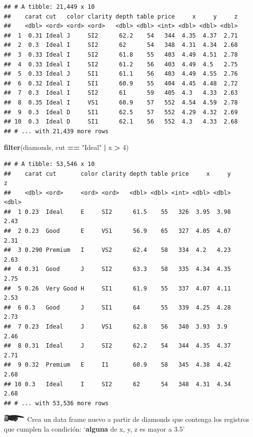 \documentclass[]{book}
\newenvironment{Shaded}{\begin{snugshade}}{\end{snugshade}}
\newcommand{\KeywordTok}[1]{\textcolor[rgb]{0.13,0.29,0.53}{\textbf{#1}}}
\newcommand{\DecValTok}[1]{\textcolor[rgb]{0.00,0.00,0.81}{#1}}
\newcommand{\StringTok}[1]{\textcolor[rgb]{0.31,0.60,0.02}{#1}}
\newcommand{\OperatorTok}[1]{\textcolor[rgb]{0.81,0.36,0.00}{\textbf{#1}}}
\newcommand{\NormalTok}[1]{#1}
\theoremstyle{definition}
\theoremstyle{definition}
\theoremstyle{definition}
\theoremstyle{remark}
\begin{document}
\begin{verbatim}
## # A tibble: 21,449 x 10
##    carat cut   color clarity depth table price     x     y     z
##    <dbl> <ord> <ord> <ord>   <dbl> <dbl> <int> <dbl> <dbl> <dbl>
##  1  0.31 Ideal J     SI2      62.2    54   344  4.35  4.37  2.71
##  2  0.3  Ideal I     SI2      62      54   348  4.31  4.34  2.68
##  3  0.33 Ideal I     SI2      61.8    55   403  4.49  4.51  2.78
##  4  0.33 Ideal I     SI2      61.2    56   403  4.49  4.5   2.75
##  5  0.33 Ideal J     SI1      61.1    56   403  4.49  4.55  2.76
##  6  0.32 Ideal I     SI1      60.9    55   404  4.45  4.48  2.72
##  7  0.3  Ideal I     SI2      61      59   405  4.3   4.33  2.63
##  8  0.35 Ideal I     VS1      60.9    57   552  4.54  4.59  2.78
##  9  0.3  Ideal D     SI1      62.5    57   552  4.29  4.32  2.69
## 10  0.3  Ideal D     SI1      62.1    56   552  4.3   4.33  2.68
## # ... with 21,439 more rows
\end{verbatim}

\begin{Shaded}
\begin{Highlighting}[]
\KeywordTok{filter}\NormalTok{(diamonds, cut }\OperatorTok{==}\StringTok{ "Ideal"} \OperatorTok{|}\StringTok{ }\NormalTok{x }\OperatorTok{>}\StringTok{ }\DecValTok{4}\NormalTok{)}
\end{Highlighting}
\end{Shaded}

\begin{verbatim}
## # A tibble: 53,546 x 10
##    carat cut       color clarity depth table price     x     y     z
##    <dbl> <ord>     <ord> <ord>   <dbl> <dbl> <int> <dbl> <dbl> <dbl>
##  1 0.23  Ideal     E     SI2      61.5    55   326  3.95  3.98  2.43
##  2 0.23  Good      E     VS1      56.9    65   327  4.05  4.07  2.31
##  3 0.290 Premium   I     VS2      62.4    58   334  4.2   4.23  2.63
##  4 0.31  Good      J     SI2      63.3    58   335  4.34  4.35  2.75
##  5 0.26  Very Good H     SI1      61.9    55   337  4.07  4.11  2.53
##  6 0.3   Good      J     SI1      64      55   339  4.25  4.28  2.73
##  7 0.23  Ideal     J     VS1      62.8    56   340  3.93  3.9   2.46
##  8 0.31  Ideal     J     SI2      62.2    54   344  4.35  4.37  2.71
##  9 0.32  Premium   E     I1       60.9    58   345  4.38  4.42  2.68
## 10 0.3   Ideal     I     SI2      62      54   348  4.31  4.34  2.68
## # ... with 53,536 more rows
\end{verbatim}

\includegraphics{./imagenes/manicule2.jpg} Crea un data frame nuevo a
partir de diamonds que contenga los registros que cumplen la condición:
`\textbf{alguna} de x, y, z es mayor a 3.5'
\end{document}

